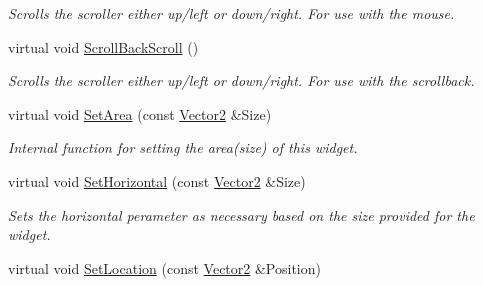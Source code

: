 \begin{DoxyCompactItemize}
\begin{DoxyCompactList}\small\item\em Scrolls the scroller either up/left or down/right. For use with the mouse. \item\end{DoxyCompactList}\item 
\hypertarget{classphys_1_1UI_1_1Scrollbar_a1c6ca6b135d09d284b31fda2230c9286}{
virtual void \hyperlink{classphys_1_1UI_1_1Scrollbar_a1c6ca6b135d09d284b31fda2230c9286}{ScrollBackScroll} ()}
\label{classphys_1_1UI_1_1Scrollbar_a1c6ca6b135d09d284b31fda2230c9286}

\begin{DoxyCompactList}\small\item\em Scrolls the scroller either up/left or down/right. For use with the scrollback. \item\end{DoxyCompactList}\item 
\hypertarget{classphys_1_1UI_1_1Scrollbar_a82ee692ee5215893d31dab0dd76374ba}{
virtual void \hyperlink{classphys_1_1UI_1_1Scrollbar_a82ee692ee5215893d31dab0dd76374ba}{SetArea} (const \hyperlink{classphys_1_1Vector2}{Vector2} \&Size)}
\label{classphys_1_1UI_1_1Scrollbar_a82ee692ee5215893d31dab0dd76374ba}

\begin{DoxyCompactList}\small\item\em Internal function for setting the area(size) of this widget. \item\end{DoxyCompactList}\item 
\hypertarget{classphys_1_1UI_1_1Scrollbar_acb5622bfb508d54f7802811e5dda4704}{
virtual void \hyperlink{classphys_1_1UI_1_1Scrollbar_acb5622bfb508d54f7802811e5dda4704}{SetHorizontal} (const \hyperlink{classphys_1_1Vector2}{Vector2} \&Size)}
\label{classphys_1_1UI_1_1Scrollbar_acb5622bfb508d54f7802811e5dda4704}

\begin{DoxyCompactList}\small\item\em Sets the horizontal perameter as necessary based on the size provided for the widget. \item\end{DoxyCompactList}\item 
\hypertarget{classphys_1_1UI_1_1Scrollbar_add3d5f729e542fe17eda663fce86d3a3}{
virtual void \hyperlink{classphys_1_1UI_1_1Scrollbar_add3d5f729e542fe17eda663fce86d3a3}{SetLocation} (const \hyperlink{classphys_1_1Vector2}{Vector2} \&Position)}
\label{classphys_1_1UI_1_1Scrollbar_add3d5f729e542fe17eda663fce86d3a3}


\end{DoxyCompactItemize}
